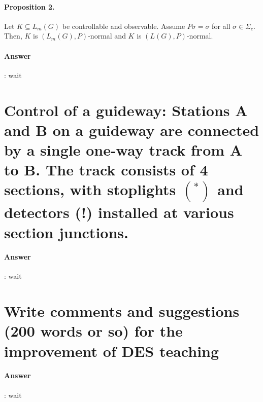 \documentclass{article}
\begin{document}
\paragraph{Proposition 2.} Let $K \subseteq L_m(G)$ be controllable and observable. Assume $P \sigma=\sigma$ for all $\sigma \in \Sigma_c$. Then, $K$ is $\left(L_m(G), P\right)$-normal and $K$ is $(L(G), P)$-normal.

\paragraph{Answer}:
wait


\section{Control of a guideway: Stations A and B on a guideway are connected by a single one-way track from A to B. The track consists of 4 sections, with stoplights $\left({ }^*\right)$ and detectors (!) installed at various section junctions.}

\paragraph{Answer}:
wait

\section{Write comments and suggestions (200 words or so) for the improvement of DES teaching}

\paragraph{Answer}:
wait
\end{document}
